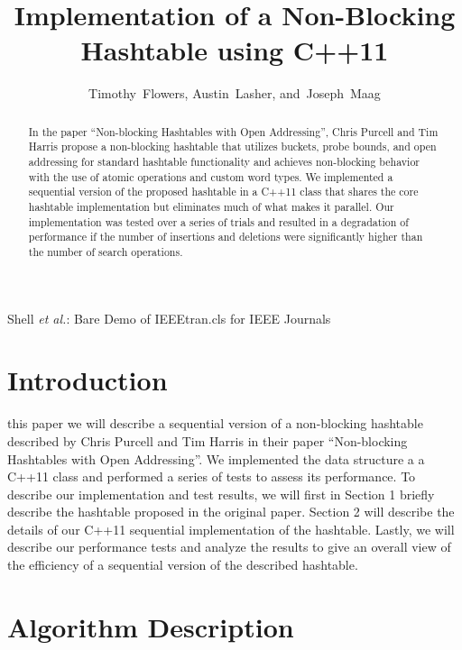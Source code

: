 \documentclass[journal]{IEEEtran}
\begin{document}
\title{Implementation of a Non-Blocking\\ Hashtable using C++11}
\author{Timothy~Flowers,
        Austin~Lasher,
        and~Joseph~Maag%
}

{Shell \MakeLowercase{\textit{et al.}}: Bare Demo of IEEEtran.cls for IEEE Journals}
\maketitle

\begin{abstract}
In the paper “Non-blocking Hashtables with Open Addressing”, Chris Purcell and Tim Harris propose a non-blocking hashtable that utilizes buckets, probe bounds, and open addressing for standard hashtable functionality and achieves non-blocking behavior with the use of atomic operations and custom word types. We implemented a sequential version of the proposed hashtable in a C++11 class that shares the core hashtable implementation but eliminates much of what makes it parallel. Our implementation was tested over a series of trials and resulted in a degradation of performance if the number of insertions and deletions were significantly higher than the number of search operations.
\end{abstract}

\section{Introduction}
 this paper we will describe a  sequential version of a non-blocking hashtable described by Chris Purcell and Tim Harris in their paper “Non-blocking Hashtables with Open Addressing”. We implemented the data structure a a C++11 class and performed a series of tests to assess its performance.
To describe our implementation and test results, we will first in Section 1 briefly describe the hashtable proposed in the original paper. Section 2 will describe the details of our C++11 sequential implementation of the hashtable. Lastly, we will describe our performance tests and analyze the results to give an overall view of the efficiency of a sequential version of the described hashtable.


 
\section{Algorithm Description}
\end{document}
